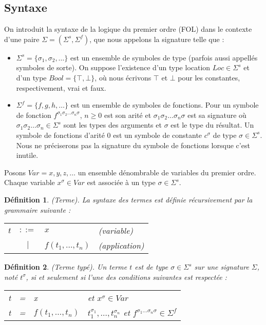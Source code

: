 \documentclass[11pt,openany]{article}
\newtheorem{definition}{D\'efinition}[subsection]
\begin{document}
	\subsection{Syntaxe}
		On introduit la syntaxe de la logique du premier ordre (FOL) dans le contexte d'une paire $\Sigma = (\Sigma^s,\Sigma^f)$, que nous appelons la signature telle que :
		\begin{itemize}
		\item $\Sigma^s = \{ \sigma_{1}, \sigma_{2},\ldots\}$ est un ensemble de symboles de type (parfois aussi appell\'es symboles de sorte). On suppose l'existence d'un type location $Loc \in \Sigma^{s}$ et d'un type $Bool = \{ \top , \bot \}$, o\`u nous \'ecrivons $\top$ et $\bot$ pour les constantes, respectivement, vrai et faux.
		\item $\Sigma^f = \{ f, g, h,\ldots\}$ est un ensemble de symboles de fonctions. Pour un symbole de fonction $f^{\sigma_{1}\sigma_{2}\ldots \sigma_{n}\sigma}$, $n \geq 0$ est son arit\'e et $\sigma_{1}\sigma_{2}\ldots \sigma_{n}\sigma$ est sa signature o\`u $\sigma_{1}\sigma_{2}\ldots \sigma_{n} \in \Sigma^{s}$ sont les types des arguments et $\sigma$ est le type du r\'esultat. Un symbole de fonctions d'arit\'e 0 est un symbole de constante $c^{\sigma}$ de type $\sigma \in \Sigma^{s}$. Nous ne pr\'eciserons pas la signature du symbole de fonctions lorsque c'est inutile.
		\end{itemize}

	   Posons $Var = {x,y,z,\ldots}$ un ensemble d\'enombrable de variables du premier ordre. Chaque variable $x^{\sigma} \in Var$ est associ\'ee \`a un type $\sigma \in \Sigma^{s}$.
	   
\begin{definition}
(Terme). La syntaxe des termes est d\'efinie r\'ecursivement par la grammaire suivante :

\begin{tabular}{lcll}
$t$ & $::=$ & $x$ & (variable) \\
 & $|$ & $f(t_1,\ldots,t_n)$ & (application)
\end{tabular}

\end{definition}	   
	   
\begin{definition} (Terme typ\'e).
Un terme $t$ est de type $\sigma\in\Sigma^s$ sur une signature $\Sigma$, not\'e $t^\sigma$, si et seulement si l'une des conditions suivantes est respect\'ee :
\begin{tabular}{lcll}
t & = & x & et $x^\sigma\in Var$\\
t & = & $f(t_1,\ldots,t_n)$ & $t_1^{\sigma_1},\ldots,t_n^{\sigma_n}$ et $f^{\sigma_1\ldots\sigma_n\sigma}\in\Sigma^f$

\end{tabular}
\end{definition}
\end{document}
